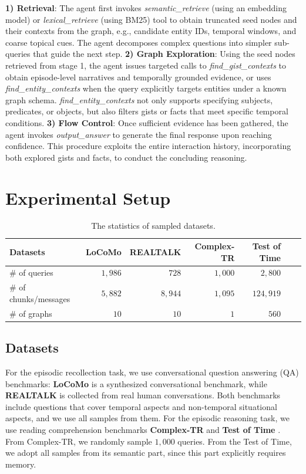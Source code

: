\documentclass{article} %
\begin{document}
\textbf{1) Retrieval}:
The agent first invokes \textit{semantic\_retrieve} (using an embedding model) or \textit{lexical\_retrieve} (using BM25) tool to obtain truncated seed nodes and their contexts from the graph, e.g., candidate entity IDs, temporal windows, and coarse topical cues. The agent decomposes complex questions into simpler sub-queries that guide the next step.
\textbf{2) Graph Exploration}:
Using the seed nodes retrieved from stage 1, the agent issues targeted calls to \textit{find\_gist\_contexts} to obtain episode-level narratives and temporally grounded evidence, or uses \textit{find\_entity\_contexts} when the query explicitly targets entities under a known graph schema.
\textit{find\_entity\_contexts} not only supports specifying subjects, predicates, or objects, but also filters gists or facts that meet specific temporal conditions.
\textbf{3) Flow Control}:
Once sufficient evidence has been gathered, the agent invokes \textit{output\_answer} to generate the final response upon reaching confidence. This procedure exploits the entire interaction history, incorporating both explored gists and facts, to conduct the concluding reasoning.


\section{Experimental Setup}


\begin{table}[tb]
\small
\centering
\caption{The statistics of sampled datasets.}
\vspace{0.2em}
\begin{tabular}{l|rrrrrr}
\toprule
Datasets & LoCoMo & REALTALK & Complex-TR & Test of Time\\ \midrule
\# of queries & $1,986$ & $728$ & $1,000$ & $2,800$ \\
\# of chunks/messages & $5,882$ & $8,944$ & $1,095$ & $124,919$  \\
\# of graphs & $10$ & $10$ & $1$ & $560$  \\
\bottomrule
\end{tabular}
\label{tab:dataset_stat}
\end{table}


\subsection{Datasets}
\label{subsec:datasets}


For the episodic recollection task, we use conversational question answering (QA) benchmarks: \textbf{LoCoMo} \citep{locomo} is a synthesized conversational benchmark, while \textbf{REALTALK} \citep{realtalk} is collected from real human conversations.
Both benchmarks include questions that cover temporal aspects and non-temporal situational aspects, and we use all samples from them.
For the episodic reasoning task, we use reading comprehension benchmarks \textbf{Complex-TR} \citep{complextr} and \textbf{Test of Time} \citep{tot}. 
From Complex-TR, we randomly sample $1,000$ queries.
From the Test of Time, we adopt all samples from its semantic part, since this part explicitly requires memory.
\end{document}
